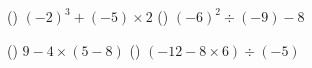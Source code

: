 \documentclass[
  12pt,a4paper,lualatex,ja=standard]{bxjsarticle}
\begin{document}
\vfill

()\hspace{2.5pt} \((-2)^3 + (-5) \times 2\)
\hspace{50mm} ()\hspace{2.5pt} \((-6)^2 \div (-9) - 8\)

\vfill

()\hspace{2.5pt} \(9 - 4 \times (5 -8)\) \hspace{50mm}
()\hspace{2.5pt} \((-12 -8 \times 6) \div (-5)\)

\vfill
\end{document}
